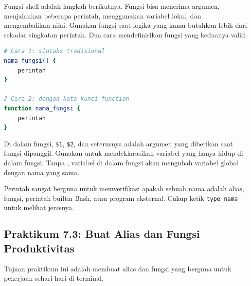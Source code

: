 Fungsi shell adalah langkah berikutnya. Fungsi bisa menerima argumen,
menjalankan beberapa perintah, menggunakan variabel lokal, dan mengembalikan
nilai. Gunakan fungsi saat logika yang kamu butuhkan lebih dari sekadar
singkatan perintah. Dua cara mendefinisikan fungsi yang keduanya valid:

\begin{lstlisting}[language=bash, caption={Dua cara mendefinisikan fungsi shell}]
# Cara 1: sintaks tradisional
nama_fungsi() {
    perintah
}

# Cara 2: dengan kata kunci function
function nama_fungsi {
    perintah
}
\end{lstlisting}

Di dalam fungsi, \texttt{\$1}, \texttt{\$2}, dan seterusnya adalah
argumen yang diberikan saat fungsi dipanggil. Gunakan  untuk
mendeklarasikan variabel yang hanya hidup di dalam fungsi. Tanpa ,
variabel di dalam fungsi akan mengubah variabel global dengan nama yang sama.

Perintah  sangat berguna untuk memverifikasi apakah sebuah nama
adalah alias, fungsi, perintah builtin Bash, atau program eksternal. Cukup
ketik \texttt{type nama} untuk melihat jenisnya.

\subsection*{Praktikum 7.3: Buat Alias dan Fungsi Produktivitas}

Tujuan praktikum ini adalah membuat alias dan fungsi yang berguna untuk
pekerjaan sehari-hari di terminal.

